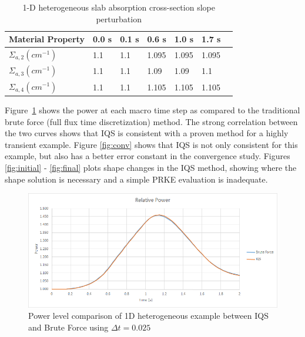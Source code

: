 \documentclass[12pt]{article}
\begin{document}
\begin{table}[!htbp]
\begin{center}
\begin{tabular}{lllllll}
\toprule
Material Property & 0.0 s & 0.1 s & 0.6 s & 1.0 s & 1.7 s \\
\midrule
$\Sigma_{a,2} (cm^{-1})$ & 1.1 & 1.1 & 1.095 & 1.095 & 1.095 \\
$\Sigma_{a,3} (cm^{-1})$ & 1.1 & 1.1 & 1.09 & 1.09 & 1.1 \\
$\Sigma_{a,4} (cm^{-1})$ & 1.1 & 1.1 & 1.105 & 1.105 & 1.105 \\
\bottomrule
\end{tabular}
\end{center}
\caption{1-D heterogeneous slab absorption cross-section slope perturbation}
\label{tab:1Dslope}
\end{table}



Figure~\ref{fig:power} shows the power at each macro time step as compared to the traditional brute force (full flux time discretization) method.  The strong correlation between the two curves shows that IQS is consistent with a proven method for a highly transient example.  Figure \ref{fig:conv} shows that IQS is not only consistent for this example, but also has a better error constant in the convergence study.  Figures \ref{fig:initial} - \ref{fig:final} plots shape changes in the IQS method, showing where the shape solution is necessary and a simple PRKE evaluation is inadequate.

\begin{figure}[!htbp]
\includegraphics[width=\linewidth]{figures/1D_het_power_plot.png}
\caption{Power level comparison of 1D heterogeneous example between IQS and Brute Force using $\Delta t = 0.025$}
\label{fig:power}
\end{figure}
\end{document}
